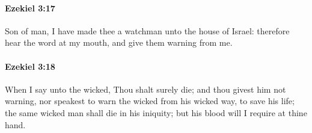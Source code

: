 		\paragraph{Ezekiel 3:17} %
			\label{EZEKIEL-3-17}

			Son of man, I have made thee a watchman unto the house of Israel: therefore hear the word at my mouth, and give them warning from me.


		\paragraph{Ezekiel 3:18} %
			\label{EZEKIEL-3-18}

			When I say unto the wicked, Thou shalt surely die; and thou givest him not warning, nor speakest to warn the wicked from his wicked way, to save his life; the same wicked man shall die in his iniquity; but his blood will I require at thine hand.

